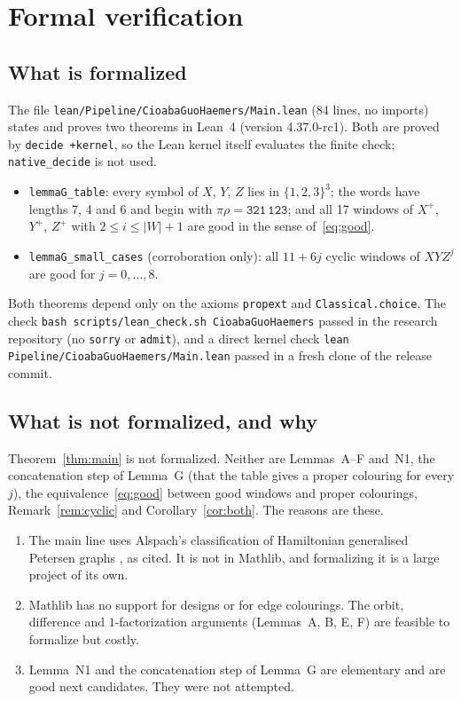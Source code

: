\documentclass[11pt]{amsart}
\theoremstyle{plain}
\theoremstyle{definition}
\theoremstyle{remark}
\numberwithin{equation}{section}
\newcommand{\abs}[1]{\lvert #1\rvert}
\newcommand{\sym}[1]{\texttt{#1}}
\newcommand{\ttt}[1]{\texttt{#1}}
\begin{document}
\section{Formal verification}\label{sec:lean}

\subsection{What is formalized}
The file \nolinkurl{lean/Pipeline/CioabaGuoHaemers/Main.lean} (84 lines, no imports) states and proves two theorems in Lean~4 (version 4.37.0-rc1). Both are proved by \ttt{decide +kernel}, so the Lean kernel itself evaluates the finite check; \ttt{native\_decide} is not used.
\begin{itemize}
\item \ttt{lemmaG\_table}: every symbol of \(X\), \(Y\), \(Z\) lies in \(\{1,2,3\}^3\); the words have lengths 7, 4 and 6 and begin with \(\pi\rho=\sym{321}\,\sym{123}\); and all 17 windows of \(X^+\), \(Y^+\), \(Z^+\) with \(2\le i\le\abs{W}+1\) are good in the sense of~\eqref{eq:good}.
\item \ttt{lemmaG\_small\_cases} (corroboration only): all \(11+6j\) cyclic windows of \(XYZ^j\) are good for \(j=0,\dots,8\).
\end{itemize}
Both theorems depend only on the axioms \ttt{propext} and \ttt{Classical.choice}. The check \ttt{bash scripts/lean\_check.sh CioabaGuoHaemers} passed in the research repository (no \ttt{sorry} or \ttt{admit}), and a direct kernel check \ttt{lean Pipeline/CioabaGuoHaemers/Main.lean} passed in a fresh clone of the release commit.

\subsection{What is not formalized, and why}
Theorem~\ref{thm:main} is not formalized. Neither are Lemmas~A--F and~N1, the concatenation step of Lemma~G (that the table gives a proper colouring for every \(j\)), the equivalence~\eqref{eq:good} between good windows and proper colourings, Remark~\ref{rem:cyclic} and Corollary~\ref{cor:both}. The reasons are these.
\begin{enumerate}
\item The main line uses Alspach's classification of Hamiltonian generalised Petersen graphs \cite{Als}, as cited. It is not in Mathlib, and formalizing it is a large project of its own.
\item Mathlib has no support for designs or for edge colourings. The orbit, difference and \(1\)-factorization arguments (Lemmas~A, B, E, F) are feasible to formalize but costly.
\item Lemma~N1 and the concatenation step of Lemma~G are elementary and are good next candidates. They were not attempted.
\end{enumerate}
\end{document}
